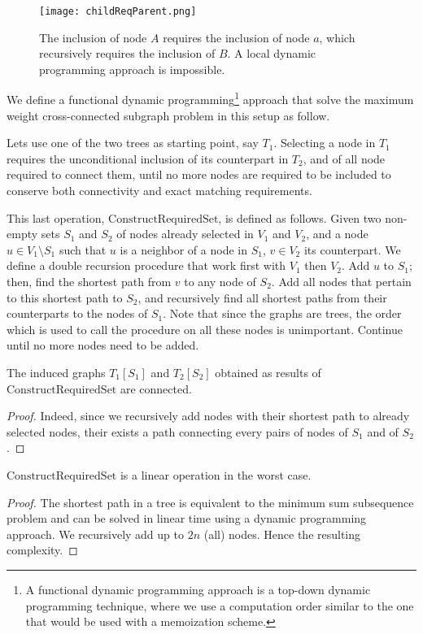 			\begin{figure}[ht]
				\centering
				\texttt{[image: childReqParent.png]}
				\label{fig:childReqParent}
				\caption{The inclusion of node $A$ requires the inclusion of node $a$, which recursively requires the inclusion of $B$. A local dynamic programming approach is impossible.}
			\end{figure}

			We define a functional dynamic programming\footnote{A functional dynamic programming approach is a top-down dynamic programming technique, where we use a computation order similar to the one that would be used with a memoization scheme.} approach that solve the maximum weight cross-connected subgraph problem in this setup as follow.

			Lets use one of the two trees as starting point, say $T_1$.
			Selecting a node in $T_1$ requires the unconditional inclusion of its counterpart in $T_2$, and of all node required to connect them, until no more nodes are required to be included to conserve both connectivity and exact matching requirements.

			This last operation, $\text{ConstructRequiredSet}$, is defined as follows.
			Given two non-empty sets $S_1$ and $S_2$ of nodes already selected in $V_1$ and $V_2$, and a node $u \in V_1 \setminus S_1$ such that $u$ is a neighbor of a node in $S_1$, $v \in V_2$ its counterpart.
			We define a double recursion procedure that work first with $V_1$ then $V_2$.
			Add $u$ to $S_1$; then, find the shortest path from $v$ to any node of $S_2$.
			Add all nodes that pertain to this shortest path to $S_2$, and recursively find all shortest paths from their counterparts to the nodes of $S_1$.
			Note that since the graphs are trees, the order which is used to call the procedure on all these nodes is unimportant.
			Continue until no more nodes need to be added.

			\begin{proposition}\label{prop:constructFuncConnected}
				The induced graphs $T_1[S_1]$ and $T_2[S_2]$ obtained as results of $\text{ConstructRequiredSet}$ are connected.
			\end{proposition}
			\begin{proof}
				Indeed, since we recursively add nodes with their shortest path to already selected nodes, their exists a path connecting every pairs of nodes of $S_1$ and of $S_2$.
			\end{proof}

			\begin{proposition}\label{prop:constructFuncQuadratic}
				$\text{ConstructRequiredSet}$ is a linear operation in the worst case.
			\end{proposition}
			\begin{proof}
				The shortest path in a tree is equivalent to the minimum sum subsequence problem and can be solved in linear time using a dynamic programming approach.
				We recursively add up to $2n$ (all) nodes.
				Hence the resulting complexity.
			\end{proof}

